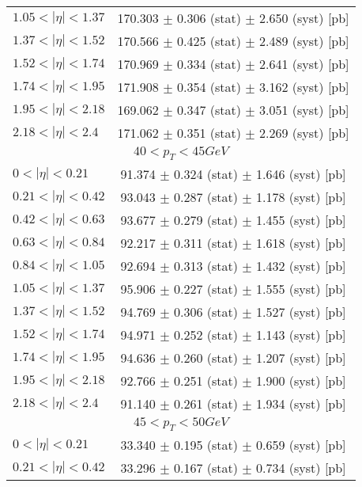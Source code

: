 \begin{tabular}{lc}
$1.05 < |\eta| <1.37$          & 170.303 $\pm$ 0.306 (stat) $\pm$ 2.650 (syst) [pb]  \\
$1.37 < |\eta| <1.52$          & 170.566 $\pm$ 0.425 (stat) $\pm$ 2.489 (syst) [pb]  \\
$1.52 < |\eta| <1.74$          & 170.969 $\pm$ 0.334 (stat) $\pm$ 2.641 (syst) [pb]  \\
$1.74 < |\eta| <1.95$          & 171.908 $\pm$ 0.354 (stat) $\pm$ 3.162 (syst) [pb]  \\
$1.95 < |\eta| <2.18$          & 169.062 $\pm$ 0.347 (stat) $\pm$ 3.051 (syst) [pb]  \\
$2.18 < |\eta| <2.4$           & 171.062 $\pm$ 0.351 (stat) $\pm$ 2.269 (syst) [pb]  \\
\hline
\multicolumn{2}{c}{$40 < p_{T} < 45 GeV$} \\
\hline
$0 < |\eta| <0.21$             & 91.374 $\pm$ 0.324 (stat) $\pm$ 1.646 (syst) [pb]  \\
$0.21 < |\eta| <0.42$          & 93.043 $\pm$ 0.287 (stat) $\pm$ 1.178 (syst) [pb]  \\
$0.42 < |\eta| <0.63$          & 93.677 $\pm$ 0.279 (stat) $\pm$ 1.455 (syst) [pb]  \\
$0.63 < |\eta| <0.84$          & 92.217 $\pm$ 0.311 (stat) $\pm$ 1.618 (syst) [pb]  \\
$0.84 < |\eta| <1.05$          & 92.694 $\pm$ 0.313 (stat) $\pm$ 1.432 (syst) [pb]  \\
$1.05 < |\eta| <1.37$          & 95.906 $\pm$ 0.227 (stat) $\pm$ 1.555 (syst) [pb]  \\
$1.37 < |\eta| <1.52$          & 94.769 $\pm$ 0.306 (stat) $\pm$ 1.527 (syst) [pb]  \\
$1.52 < |\eta| <1.74$          & 94.971 $\pm$ 0.252 (stat) $\pm$ 1.143 (syst) [pb]  \\
$1.74 < |\eta| <1.95$          & 94.636 $\pm$ 0.260 (stat) $\pm$ 1.207 (syst) [pb]  \\
$1.95 < |\eta| <2.18$          & 92.766 $\pm$ 0.251 (stat) $\pm$ 1.900 (syst) [pb]  \\
$2.18 < |\eta| <2.4$           & 91.140 $\pm$ 0.261 (stat) $\pm$ 1.934 (syst) [pb]  \\
\hline
\multicolumn{2}{c}{$45 < p_{T} < 50 GeV$} \\
\hline
$0 < |\eta| <0.21$             & 33.340 $\pm$ 0.195 (stat) $\pm$ 0.659 (syst) [pb]  \\
$0.21 < |\eta| <0.42$          & 33.296 $\pm$ 0.167 (stat) $\pm$ 0.734 (syst) [pb]  \\

\end{tabular}
